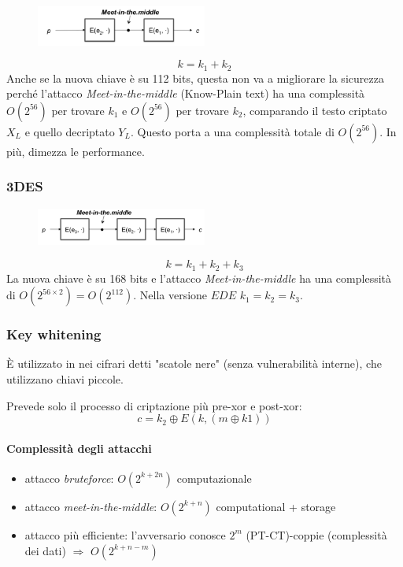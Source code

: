 \documentclass[a4paper,12pt]{article}
\begin{document}
\begin{figure}[H]
  \centering
  \includegraphics[width=0.5\textwidth]{img/2des}
\end{figure}

$$k = k_1 + k_2$$
Anche se la nuova chiave è su 112 bits, questa non va a migliorare la sicurezza perché l'attacco \textit{Meet-in-the-middle} (Know-Plain text) ha una complessità $O(2^{56})$ per trovare $k_1$ e $O(2^{56})$ per trovare $k_2$, comparando il testo criptato $X_L$ e quello decriptato $Y_L$. Questo porta a una complessità totale di $O(2^{56})$. In più, dimezza le performance.

\subsubsection{3DES}

\begin{figure}[H]
  \centering
  \includegraphics[width=0.5\textwidth]{img/3des}
\end{figure}

$$k = k_1 + k_2 + k_3$$
La nuova chiave è su 168 bits e l'attacco \textit{Meet-in-the-middle} ha una complessità di $O(2^{56\times2}) = O(2^{112})$.
Nella versione $EDE$ $k_1 = k_2 = k_3$.

\subsubsection{Key whitening}
È utilizzato in nei cifrari detti "scatole nere" (senza vulnerabilità interne), che utilizzano chiavi piccole.

Prevede solo il processo di criptazione più pre-xor e post-xor:
$$ c = k_2 \oplus E(k, (m \oplus k1)) $$

\paragraph{Complessità degli attacchi}
\begin{itemize}
	\item attacco \textit{bruteforce}: $O(2^{k+2n})$ computazionale
	\item attacco \textit{meet-in-the-middle}: $O(2^{k+n})$ computational + storage
	\item attacco più efficiente: l'avversario conosce $2^m$ (PT-CT)-coppie (complessità dei dati) $\Rightarrow$ $O(2^{k+n-m})$
\end{itemize}
\end{document}
